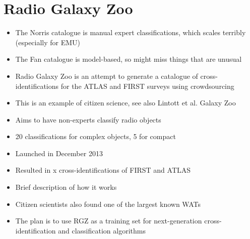     \section{Radio Galaxy Zoo}
    \label{sec:radio-galaxy-zoo}

        \begin{itemize}
            \item The Norris catalogue is manual expert classifications, which scales terribly (especially for EMU)
            \item The Fan catalogue is model-based, so might miss things that are unusual
            \item Radio Galaxy Zoo is an attempt to generate a catalogue of cross-identifications for the ATLAS and FIRST surveys using crowdsourcing
            \item This is an example of citizen science, see also Lintott et al. Galaxy Zoo
            \item Aims to have non-experts classify radio objects \cite{norris16}
            \item 20 classifications for complex objects, 5 for compact \cite{banfield15}
            \item Launched in December 2013
            \item Resulted in x cross-identifications of FIRST and ATLAS
            \item Brief description of how it works
            \item Citizen scientists also found one of the largest known WATs \cite{banfield16}
            \item The plan is to use RGZ as a training set for next-generation cross-identification and classification algorithms
        \end{itemize}


